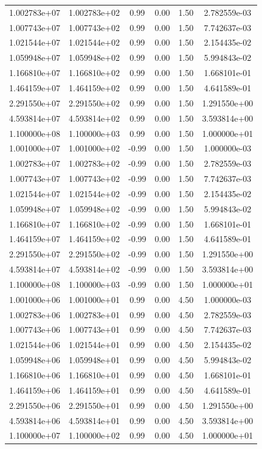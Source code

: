 \documentclass{article}
\begin{document}
\begin{table}[htbp]
\begin{tabular}{cccccc}
1.002783e+07 & 1.002783e+02 & 0.99 & 0.00 & 1.50 & 2.782559e-03 \\
1.007743e+07 & 1.007743e+02 & 0.99 & 0.00 & 1.50 & 7.742637e-03 \\
1.021544e+07 & 1.021544e+02 & 0.99 & 0.00 & 1.50 & 2.154435e-02 \\
1.059948e+07 & 1.059948e+02 & 0.99 & 0.00 & 1.50 & 5.994843e-02 \\
1.166810e+07 & 1.166810e+02 & 0.99 & 0.00 & 1.50 & 1.668101e-01 \\
1.464159e+07 & 1.464159e+02 & 0.99 & 0.00 & 1.50 & 4.641589e-01 \\
2.291550e+07 & 2.291550e+02 & 0.99 & 0.00 & 1.50 & 1.291550e+00 \\
4.593814e+07 & 4.593814e+02 & 0.99 & 0.00 & 1.50 & 3.593814e+00 \\
1.100000e+08 & 1.100000e+03 & 0.99 & 0.00 & 1.50 & 1.000000e+01 \\
1.001000e+07 & 1.001000e+02 & -0.99 & 0.00 & 1.50 & 1.000000e-03 \\
1.002783e+07 & 1.002783e+02 & -0.99 & 0.00 & 1.50 & 2.782559e-03 \\
1.007743e+07 & 1.007743e+02 & -0.99 & 0.00 & 1.50 & 7.742637e-03 \\
1.021544e+07 & 1.021544e+02 & -0.99 & 0.00 & 1.50 & 2.154435e-02 \\
1.059948e+07 & 1.059948e+02 & -0.99 & 0.00 & 1.50 & 5.994843e-02 \\
1.166810e+07 & 1.166810e+02 & -0.99 & 0.00 & 1.50 & 1.668101e-01 \\
1.464159e+07 & 1.464159e+02 & -0.99 & 0.00 & 1.50 & 4.641589e-01 \\
2.291550e+07 & 2.291550e+02 & -0.99 & 0.00 & 1.50 & 1.291550e+00 \\
4.593814e+07 & 4.593814e+02 & -0.99 & 0.00 & 1.50 & 3.593814e+00 \\
1.100000e+08 & 1.100000e+03 & -0.99 & 0.00 & 1.50 & 1.000000e+01 \\
1.001000e+06 & 1.001000e+01 & 0.99 & 0.00 & 4.50 & 1.000000e-03 \\
1.002783e+06 & 1.002783e+01 & 0.99 & 0.00 & 4.50 & 2.782559e-03 \\
1.007743e+06 & 1.007743e+01 & 0.99 & 0.00 & 4.50 & 7.742637e-03 \\
1.021544e+06 & 1.021544e+01 & 0.99 & 0.00 & 4.50 & 2.154435e-02 \\
1.059948e+06 & 1.059948e+01 & 0.99 & 0.00 & 4.50 & 5.994843e-02 \\
1.166810e+06 & 1.166810e+01 & 0.99 & 0.00 & 4.50 & 1.668101e-01 \\
1.464159e+06 & 1.464159e+01 & 0.99 & 0.00 & 4.50 & 4.641589e-01 \\
2.291550e+06 & 2.291550e+01 & 0.99 & 0.00 & 4.50 & 1.291550e+00 \\
4.593814e+06 & 4.593814e+01 & 0.99 & 0.00 & 4.50 & 3.593814e+00 \\
1.100000e+07 & 1.100000e+02 & 0.99 & 0.00 & 4.50 & 1.000000e+01 \\
\hline
\end{tabular}
\end{table}
\end{document}
